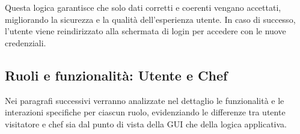 Questa logica garantisce che solo dati corretti e coerenti vengano accettati, migliorando la sicurezza e la qualità dell’esperienza utente. In caso di successo, l’utente viene reindirizzato alla schermata di login per accedere con le nuove credenziali.

\subsection{Ruoli e funzionalità: Utente e Chef}
Nei paragrafi successivi verranno analizzate nel dettaglio le funzionalità e le interazioni specifiche per ciascun ruolo, evidenziando le differenze tra utente visitatore e chef sia dal punto di vista della GUI che della logica applicativa.
